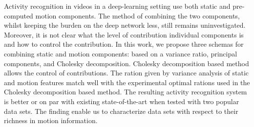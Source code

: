 Activity recognition in videos in a deep-learning setting use both static and pre-computed motion components. The method of combining the two components, whilst keeping the burden on the deep network less, still remains uninvestigated. Moreover, it is not clear what the level of contribution individual components is and how to control the contribution. In this work, we propose three schemas  for combining static and motion components: based on a variance ratio, principal components, and Cholesky decomposition. Cholesky decomposition based method allows the control of contributions. The ration given by variance analysis of static and motion features match well with the experimental optimal rations used in the Cholesky decomposition based method. The resulting activity recognition system is better or on par with existing state-of-the-art when tested with two popular data sets. The finding enable us to characterize data sets  with respect to their richness in  motion information. 